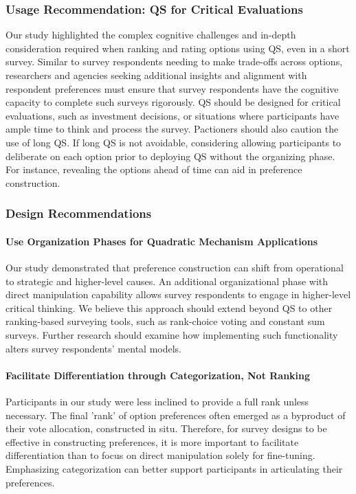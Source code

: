 \subsubsection{Usage Recommendation: QS for Critical Evaluations}
Our study highlighted the complex cognitive challenges and in-depth consideration required when ranking and rating options using QS, even in a short survey. Similar to survey respondents needing to make trade-offs across options, researchers and agencies seeking additional insights and alignment with respondent preferences must ensure that survey respondents have the cognitive capacity to complete such surveys rigorously. QS should be designed for critical evaluations, such as investment decisions, or situations where participants have ample time to think and process the survey. Pactioners should also caution the use of long QS. If long QS is not avoidable, considering allowing participants to deliberate on each option prior to deploying QS without the organizing phase. For instance, revealing the options ahead of time can aid in preference construction.

\subsubsection{Design Recommendations}
\paragraph{Use Organization Phases for Quadratic Mechanism Applications}
Our study demonstrated that preference construction can shift from operational to strategic and higher-level causes. An additional organizational phase with direct manipulation capability allows survey respondents to engage in higher-level critical thinking. We believe this approach should extend beyond QS to other ranking-based surveying tools, such as rank-choice voting and constant sum surveys. Further research should examine how implementing such functionality alters survey respondents' mental models.

\paragraph{Facilitate Differentiation through Categorization, Not Ranking}
Participants in our study were less inclined to provide a full rank unless necessary. The final 'rank' of option preferences often emerged as a byproduct of their vote allocation, constructed in situ. Therefore, for survey designs to be effective in constructing preferences, it is more important to facilitate differentiation than to focus on direct manipulation solely for fine-tuning. Emphasizing categorization can better support participants in articulating their preferences.

